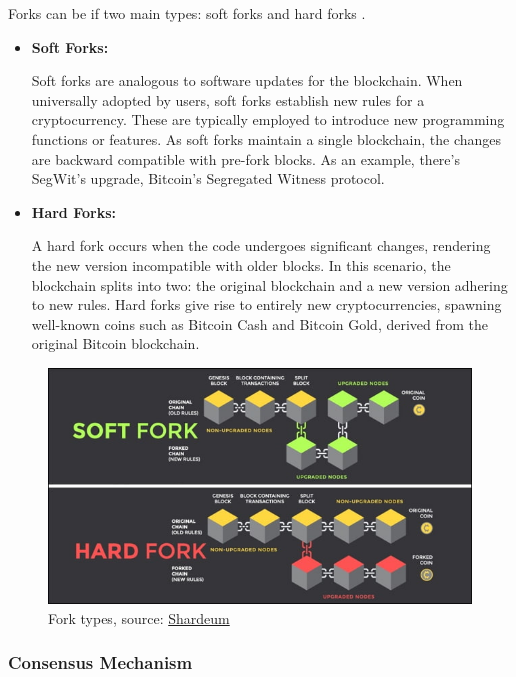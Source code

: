 Forks can be if two main types: soft forks and hard forks \cite{fork}.

\begin{itemize}
    \item \textbf{Soft Forks:}

    Soft forks are analogous to software updates for the blockchain.
When universally adopted by users, soft forks establish new rules for a cryptocurrency.
These are typically employed to introduce new programming functions or features.
As soft forks maintain a single blockchain, the changes are backward compatible with pre-fork blocks. As an example, there's SegWit's upgrade, Bitcoin's Segregated Witness protocol.\newline
    \item \textbf{Hard Forks:}

    A hard fork occurs when the code undergoes significant changes, rendering the new version incompatible with older blocks.
In this scenario, the blockchain splits into two: the original blockchain and a new version adhering to new rules.
Hard forks give rise to entirely new cryptocurrencies, spawning well-known coins such as Bitcoin Cash and Bitcoin Gold, derived from the original Bitcoin blockchain.

\end{itemize}

\begin{figure}[htbp]
	\centering
	\includegraphics[scale=0.5]{figures/fork_type.jpeg}  %
	\caption{Fork types, source: \href{https://shardeum.org/blog/what-is-a-blockchain-fork/}{Shardeum}}
	\label{fig:fork_type}
\end{figure}



\subsubsection{Consensus Mechanism} \label{cons.mec}

